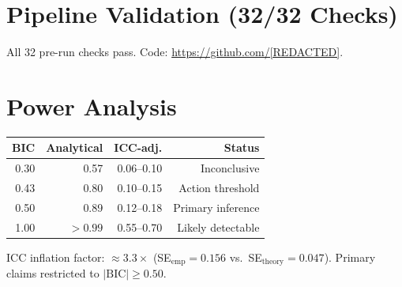 \documentclass[10pt,conference]{IEEEtran}
\newcommand{\BIC}{\mathrm{BIC}}
\begin{document}
\section{Pipeline Validation (32/32 Checks)}
\label{app:validation}
All 32 pre-run checks pass. Code:
\url{https://github.com/[REDACTED]}.

\section{Power Analysis}
\label{app:power}
\begin{center}\small
\begin{tabular}{rrrr}
\toprule
BIC & Analytical & ICC-adj. & Status \\
\midrule
0.30 & 0.57 & 0.06--0.10 & Inconclusive \\
0.43 & 0.80 & 0.10--0.15 & Action threshold \\
0.50 & 0.89 & 0.12--0.18 & Primary inference \\
1.00 & $>0.99$ & 0.55--0.70 & Likely detectable \\
\bottomrule
\end{tabular}
\end{center}
ICC inflation factor: ${\approx}3.3{\times}$
(SE$_\text{emp}{=}0.156$ vs.\ SE$_\text{theory}{=}0.047$).
Primary claims restricted to $|\BIC|{\geq}0.50$.
\end{document}
